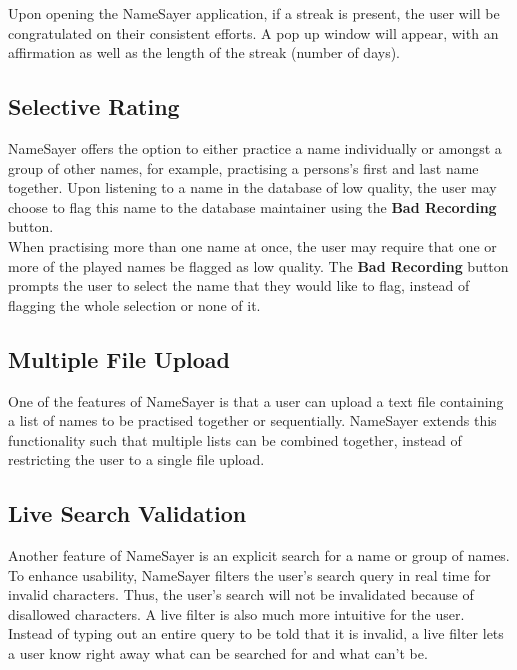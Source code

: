 \documentclass{article}
\begin{document}
Upon opening the NameSayer application, if a streak is present, the user will be congratulated on their consistent efforts.
A pop up window will appear, with an affirmation as well as the length of the streak (number of days).

\subsection{Selective Rating}
NameSayer offers the option to either practice a name individually or amongst a group of other names, for example,
practising a persons's first and last name together. Upon listening to a name in the database of low quality, the user may
choose to flag this name to the database maintainer using the \textbf{Bad Recording} button. \\

When practising more than one name
at once, the user may require that one or more of the played names be flagged as low quality. The \textbf{Bad Recording} button
prompts the user to select the name that they would like to flag, instead of flagging the whole selection or none of it.

\subsection{Multiple File Upload}
One of the features of NameSayer is that a user can upload a text file containing a list of names to be practised together or 
sequentially. NameSayer extends this functionality such that multiple lists can be combined together, instead of restricting
the user to a single file upload.

\subsection{Live Search Validation}
Another feature of NameSayer is an explicit search for a name or group of names. To enhance usability, NameSayer filters 
the user's search query in real time for invalid characters. Thus, the user's search will not be invalidated because of disallowed
characters. A live filter is also much more intuitive for the user. Instead of typing out an entire query to be told that it is invalid,
a live filter lets a user know right away what can be searched for and what can't be.
\end{document}
